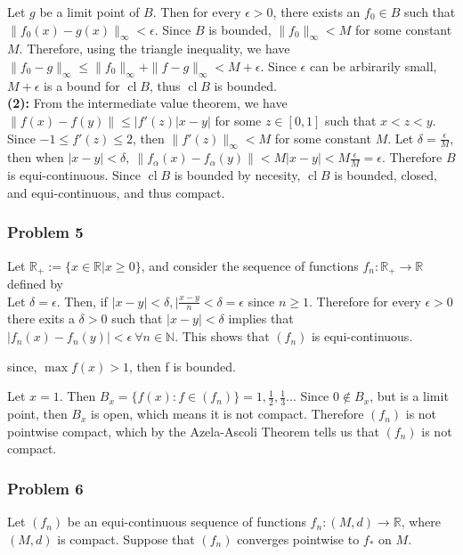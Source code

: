 \documentclass{article}
\DeclareMathOperator*{\cl}{cl}
\newcommand{\N}{\mathbb{N}}
\newcommand{\R}{\mathbb{R}}
\begin{document}
Let $g$ be a limit point of $B$. Then for every $\epsilon > 0$, there exists an $f_0 \in B$ such that $\|f_0(x) - g(x)\|_\infty < \epsilon$. Since $B$ is bounded, $\|f_0\|_\infty < M$ for some constant $M$. Therefore, using the triangle inequality, we have $\|f_0 - g\|_\infty \leq \|f_0\|_\infty + \|f - g\|_\infty < M + \epsilon$. Since $\epsilon$ can be arbirarily small, $M + \epsilon$ is a bound for $\cl B$, thus $\cl B$ is bounded.\\

\noindent \textbf{(2):} From the intermediate value theorem, we have $\|f(x) - f(y)\| \leq |f'(z)|x-y|$ for some $z \in [0, 1]$ such that $x < z < y$. Since $-1 \leq f'(z) \leq 2$, then $\|f'(z)\|_\infty < M$ for some constant $M$. Let $\delta = \frac{\epsilon}{M}$, then when $|x - y| < \delta, \ \|f_\alpha(x) - f_\alpha(y)\| < M|x-y| < M \frac{\epsilon}{M} = \epsilon$. Therefore $B$ is equi-continuous. Since $\cl B$ is bounded by necesity, $\cl B$ is bounded, closed, and equi-continuous, and thus compact.\\

\subsubsection*{Problem 5}
Let $\R_+ := \{x \in \R | x \geq 0\}$, and consider the sequence of functions $f_n : \R_+ \rightarrow \R$ defined by\\

Let $\delta = \epsilon$. Then, if $|x - y| < \delta, |\frac{x - y}{n} < \delta = \epsilon$ since $n \geq 1$. Therefore for every $\epsilon > 0$ there exits a $\delta > 0$ such that $|x - y| < \delta$ implies that $|f_n(x) - f_n(y)| < \epsilon \ \forall n \in \N$. This shows that $(f_n)$ is equi-continuous.

since, $\max{f(x)} > 1$, then f is bounded.

Let $x = 1$. Then $B_x = \{f(x): f \in (f_n)\} = 1, \frac{1}{2}, \frac{1}{3}...$ Since $0 \not\in B_x$, but is a limit point, then $B_x$ is open, which means it is not compact. Therefore $(f_n)$ is not pointwise compact, which by the Azela-Ascoli Theorem tells us that $(f_n)$ is not compact.

\subsubsection*{Problem 6}
Let $(f_n)$ be an equi-continuous sequence of functions $f_n : (M, d) \rightarrow \R$, where $(M, d)$ is compact. Suppose that $(f_n)$ converges pointwise to $f_*$ on $M$.\\
\end{document}

